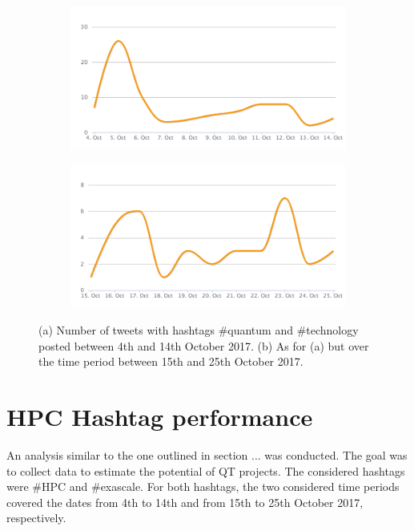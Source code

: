 \begin{figure}
 \centering
 \begin{subfigure}[b]{0.9\textwidth}
   \includegraphics[width=1\linewidth]{Images/FirstSearch_QuantumTechnology.png}
   \caption{} 
 \end{subfigure}

 \begin{subfigure}[b]{0.9\textwidth}
   \includegraphics[width=1\linewidth]{Images/SecondSearch_QuantumTechnology.png}
   \caption{}
 \end{subfigure}
 \caption{(a) Number of tweets with hashtags \#quantum and \#technology posted between 4th and 14th October 2017. (b) As for (a) but over the time period between 15th and 25th October 2017.} 
 \label{First-SecondSearch_QuantumTechnology}
\end{figure}

\section{HPC Hashtag performance}
An analysis similar to the one outlined in section ... was conducted. The goal was to collect data to estimate the potential of QT projects. The considered hashtags were \#HPC and \#exascale. For both hashtags, the two considered time periods covered the dates from 4th to 14th and from 15th to 25th October 2017, respectively. 

